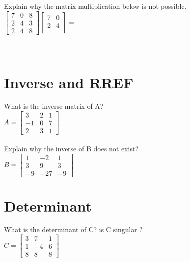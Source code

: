 \documentclass{article}
\begin{document}
Explain why the matrix multiplication below is not possible.\\
$\begin{bmatrix}
7 & 0 & 8\\
2 & 4 & 3 \\
2 & 4 & 8
\end{bmatrix} 
\begin{bmatrix}
7 & 0 \\
2 & 4  \\
\end{bmatrix} 
=$ \\\\\\

\section{Inverse and RREF}
What is the inverse matrix of A?\\
$A=
\begin{bmatrix}
3 & 2 & 1\\
-1 & 0 & 7 \\
2 & 3 & 1
\end{bmatrix}$\\\\ 

Explain why the inverse of B does not exist?\\
$B=
\begin{bmatrix}
1 & -2 & 1\\
3 & 9 & 3 \\
-9 & -27 & -9
\end{bmatrix}$
\section{Determinant}
What is the determinant of C? is C singular ? \\
$C=
\begin{bmatrix}
3 & 7 & 1\\
1 & -4 & 6 \\
8 & 8 & 8
\end{bmatrix}$
\end{document}
